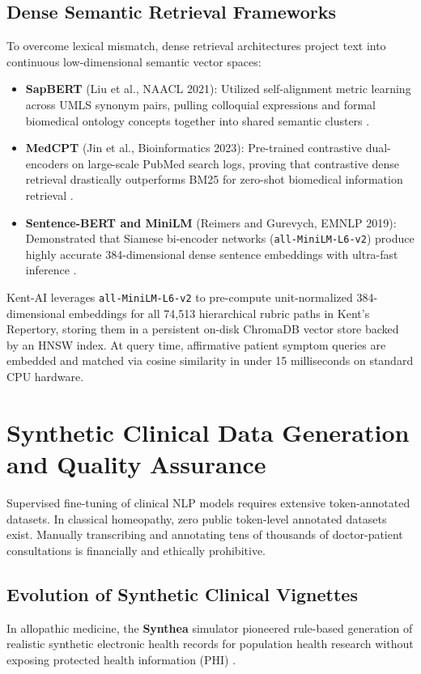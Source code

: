 \begin{sloppypar}
\subsection{Dense Semantic Retrieval Frameworks}
To overcome lexical mismatch, dense retrieval architectures project text into continuous low-dimensional semantic vector spaces:
\begin{itemize}
    \item \textbf{SapBERT} (Liu et al., NAACL 2021): Utilized self-alignment metric learning across UMLS synonym pairs, pulling colloquial expressions and formal biomedical ontology concepts together into shared semantic clusters \cite{Liu2021_SapBERT}.
    \item \textbf{MedCPT} (Jin et al., Bioinformatics 2023): Pre-trained contrastive dual-encoders on large-scale PubMed search logs, proving that contrastive dense retrieval drastically outperforms BM25 for zero-shot biomedical information retrieval \cite{Jin2023_MedCPT}.
    \item \textbf{Sentence-BERT and MiniLM} (Reimers and Gurevych, EMNLP 2019): Demonstrated that Siamese bi-encoder networks (\texttt{all-MiniLM-L6-v2}) produce highly accurate 384-dimensional dense sentence embeddings with ultra-fast inference \cite{Reimers2019_SBERT}.
\end{itemize}

Kent-AI leverages \texttt{all-MiniLM-L6-v2} to pre-compute unit-normalized 384-dimensional embeddings for all 74,513 hierarchical rubric paths in Kent's Repertory, storing them in a persistent on-disk ChromaDB vector store backed by an HNSW index. At query time, affirmative patient symptom queries are embedded and matched via cosine similarity in under 15 milliseconds on standard CPU hardware.

\section{Synthetic Clinical Data Generation and Quality Assurance}
Supervised fine-tuning of clinical NLP models requires extensive token-annotated datasets. In classical homeopathy, zero public token-level annotated datasets exist. Manually transcribing and annotating tens of thousands of doctor-patient consultations is financially and ethically prohibitive.

\subsection{Evolution of Synthetic Clinical Vignettes}
In allopathic medicine, the \textbf{Synthea} simulator pioneered rule-based generation of realistic synthetic electronic health records for population health research without exposing protected health information (PHI) \cite{Walonoski2018_Synthea}.


\end{sloppypar}
